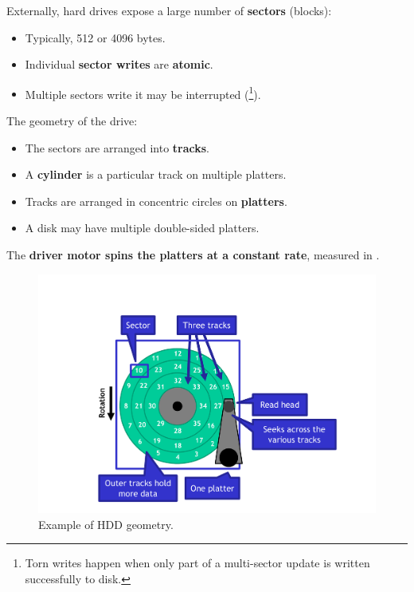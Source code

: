 \noindent
Externally, hard drives expose a large number of \textbf{sectors} (blocks):
\begin{itemize}
    \item Typically, 512 or 4096 bytes.
    \item Individual \textbf{sector writes} are \textbf{atomic}.
    \item Multiple sectors write it may be interrupted (\footnote{Torn writes happen when only part of a multi-sector update is written successfully to disk.}).
\end{itemize}
The geometry of the drive:
\begin{itemize}
    \item The sectors are arranged into \textbf{tracks}.
    \item A \textbf{cylinder} is a particular track on multiple platters.
    \item Tracks are arranged in concentric circles on \textbf{platters}.
    \item A disk may have multiple double-sided platters.
\end{itemize}
The \textbf{driver motor spins the platters at a constant rate}, measured in .

\newpage

\begin{figure}[!htp]
    \centering
    \includegraphics[width=.8\textwidth]{img/files-7.pdf}
    \caption{Example of HDD geometry.}
\end{figure}

